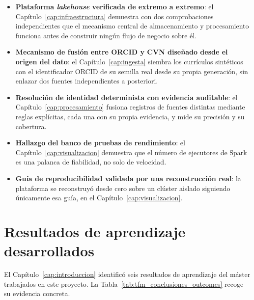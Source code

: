 \begin{itemize}
  \item \textbf{Plataforma \textit{lakehouse} verificada de extremo a
  extremo}: el Capítulo~\ref{cap:infraestructura} demuestra con dos
  comprobaciones independientes que el mecanismo central de
  almacenamiento y procesamiento funciona antes de construir ningún flujo
  de negocio sobre él.
  \item \textbf{Mecanismo de fusión entre ORCID y CVN diseñado desde el
  origen del dato}: el Capítulo~\ref{cap:ingesta} siembra los currículos
  sintéticos con el identificador ORCID de su semilla real desde su
  propia generación, sin enlazar dos fuentes independientes a posteriori.
  \item \textbf{Resolución de identidad determinista con evidencia
  auditable}: el Capítulo~\ref{cap:procesamiento} fusiona registros de
  fuentes distintas mediante reglas explícitas, cada una con su propia
  evidencia, y mide su precisión y su cobertura.
  \item \textbf{Hallazgo del banco de pruebas de rendimiento}: el
  Capítulo~\ref{cap:visualizacion} demuestra que el número de ejecutores
  de Spark es una palanca de fiabilidad, no solo de velocidad.
  \item \textbf{Guía de reproducibilidad validada por una reconstrucción
  real}: la plataforma se reconstruyó desde cero sobre un clúster aislado
  siguiendo únicamente esa guía, en el Capítulo~\ref{cap:visualizacion}.
\end{itemize}

\section{Resultados de aprendizaje desarrollados}
\label{sec:conclusiones_outcomes}

El Capítulo~\ref{cap:introduccion} identificó seis resultados de
aprendizaje del máster trabajados en este proyecto. La
Tabla~\ref{tab:tfm_conclusiones_outcomes} recoge su evidencia concreta.

